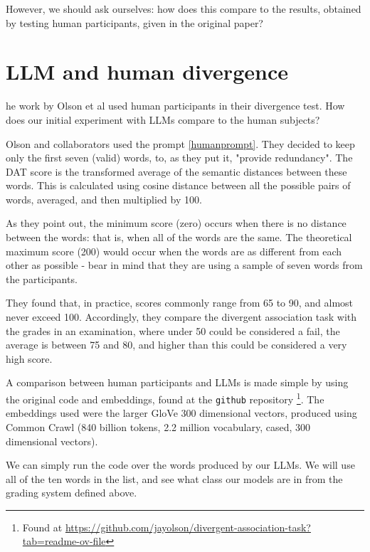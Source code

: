 \documentclass[9pt,a4paper,twoside]{rho-class/rho}
\begin{document}
However, we should ask ourselves: how does this compare to the results, obtained by testing human participants, given in the original paper?

\section{LLM and human divergence}

he work by Olson et al \cite{Olson_2021} used human participants in their divergence test. How does our initial experiment with LLMs compare to the human subjects?

Olson and collaborators used the prompt \ref{humanprompt}. They decided to keep only the first seven (valid) words, to, as they put it, "provide redundancy". The DAT score is the transformed average of the semantic distances between these words. This is calculated using cosine distance between all the possible pairs of words, averaged, and then multiplied by 100. 

As they point out, the minimum score (zero) occurs when there is no distance between the words: that is, when all of the words are the same. The theoretical maximum score (200) would occur when the words are as different from each other as possible - bear in mind that they are using a sample of seven words from the participants.  

They found that, in practice, scores commonly range from 65 to 90, and almost never exceed 100. Accordingly, they compare the divergent association task with the grades in an examination, where under 50 could be considered a fail, the average is between 75 and 80, and higher than this could be considered a very high score.

A comparison between human participants and LLMs is made simple by using the original code and embeddings, found at the \texttt{github} repository \footnote{Found at \url{https://github.com/jayolson/divergent-association-task?tab=readme-ov-file}}. The embeddings used were the larger GloVe 300 dimensional vectors, produced using Common Crawl (840 billion tokens, 2.2 million vocabulary, cased, 300 dimensional vectors).  

We can simply run the code over the words produced by our LLMs. We will use all of the ten words in the list, and see what class our models are in from the grading system defined above.
\end{document}
